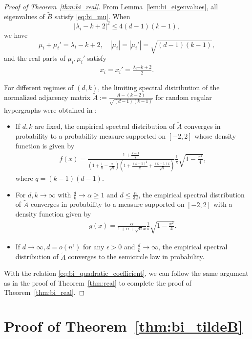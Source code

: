 \documentclass[11pt,reqno]{amsart}
\theoremstyle{definition}
\begin{document}
\begin{proof}[Proof of Theorem~\ref{thm:bi_real}]
    From Lemma~\ref{lem:bi_eigenvalues}, all eigenvalues of $\tilde B$ {satisfy} \eqref{eq:bi_mu}.
When \[|\lambda_i-k+2|^2\leq 4(d-1)(k-1),\] we have 
\[\mu_i+ \mu_i'=\lambda_i-k+2, \quad |\mu_i|=|\mu_i'|=\sqrt{(d-1)(k-1)},\] and   the real parts of $\mu_i,\mu_i'$ satisfy 
 \begin{align}\label{eq:bi_quadratic_coefficient}
 x_i = x_i' = \frac{\lambda_i {-k+2}}{2}.
 \end{align}

 For different  regimes of $(d,k)$, the limiting spectral distribution of the normalized adjacency matrix $\tilde A:=\frac{A-(k-2)}{\sqrt{(d-1)(k-1)}}$ for random regular hypergraphs were obtained in \cite[Corollary 6.11]{dumitriu2021spectra}:
 \begin{itemize}
     \item If $d,k$ are fixed,   the empirical spectral distribution of $\tilde{A}$ converges in probability to a probability measure supported on $[-2,2]$ whose density function is given by \begin{align}
	f(x)=\frac{1+\frac{k-1}{q}}{(1+\frac{1}{q}-\frac{x}{\sqrt{q}})(1+\frac{(k-1)^2}{q}+\frac{(k-1)x}{\sqrt{q}})}\frac{1}{\pi}\sqrt{1-\frac{x^2}{4}},
	\end{align}
	where $q=(k-1)(d-1)$.
	 \item For $d,k\to\infty$ with $\frac{d}{k}\to\alpha\geq 1$ and $d\leq \frac{n}{32}$,  the empirical spectral distribution of $\tilde{A}$ converges in probability to  a measure supported on $[-2,2]$ with a density function given by	
	 \begin{align}\label{mua}
	g(x)=\frac{\alpha}{1+\alpha+\sqrt{\alpha}x}\frac{1}{\pi}\sqrt{1-\frac{x^2}{4}} .
	\end{align}
    \item If $d\to\infty, d=o(n^{\epsilon})$ for any $\epsilon>0$ and $\frac{d}{k}\to\infty$,  the empirical spectral distribution of $\tilde A$ converges to the semicircle law in probability.
 \end{itemize}
 With the relation \eqref{eq:bi_quadratic_coefficient}, we can follow the same argument as in the proof of Theorem~\ref{thm:real} to complete the proof of Theorem~\ref{thm:bi_real}.
\end{proof}

\section{Proof of Theorem~\ref{thm:bi_tildeB}} 
\end{document}

